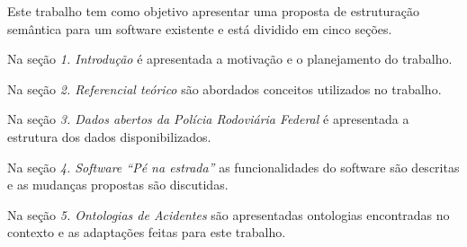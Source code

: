 Este trabalho tem como objetivo apresentar uma proposta de estruturação semântica
para um software existente e está dividido em cinco seções.

Na seção \textit{1. Introdução} é apresentada a motivação e o planejamento do trabalho.

Na seção \textit{2. Referencial teórico} são abordados conceitos utilizados no trabalho.

Na seção \textit{3. Dados abertos da Polícia Rodoviária Federal} é apresentada a estrutura
dos dados disponibilizados.

Na seção \textit{4. Software “Pé na estrada”} as funcionalidades do software são descritas e
as mudanças propostas são discutidas.

Na seção \textit{5. Ontologias de Acidentes} são apresentadas ontologias encontradas no
contexto e as adaptações feitas para este trabalho.
